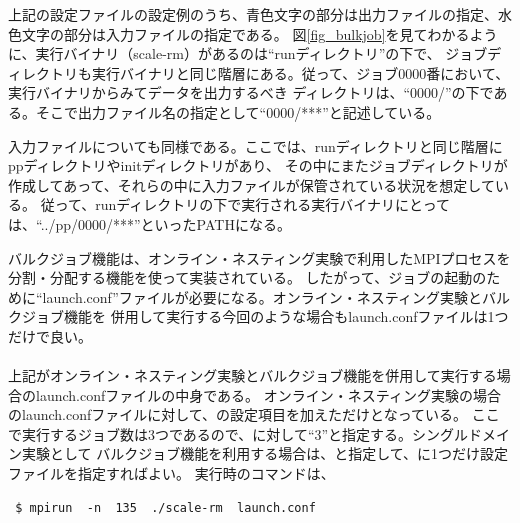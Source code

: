 \noindent 上記の設定ファイルの設定例のうち、青色文字の部分は出力ファイルの指定、水色文字の部分は入力ファイルの指定である。
図\ref{fig_bulkjob}を見てわかるように、実行バイナリ（scale-rm）があるのは``runディレクトリ''の下で、
ジョブディレクトリも実行バイナリと同じ階層にある。従って、ジョブ0000番において、実行バイナリからみてデータを出力するべき
ディレクトリは、``0000/''の下である。そこで出力ファイル名の指定として``0000/***''と記述している。

入力ファイルについても同様である。ここでは、runディレクトリと同じ階層にppディレクトリやinitディレクトリがあり、
その中にまたジョブディレクトリが作成してあって、それらの中に入力ファイルが保管されている状況を想定している。
従って、runディレクトリの下で実行される実行バイナリにとっては、``../pp/0000/***''といったPATHになる。

バルクジョブ機能は、オンライン・ネスティング実験で利用したMPIプロセスを分割・分配する機能を使って実装されている。
したがって、ジョブの起動のために``launch.conf''ファイルが必要になる。オンライン・ネスティング実験とバルクジョブ機能を
併用して実行する今回のような場合もlaunch.confファイルは1つだけで良い。\\

\\

\noindent 上記がオンライン・ネスティング実験とバルクジョブ機能を併用して実行する場合のlaunch.confファイルの中身である。
オンライン・ネスティング実験の場合のlaunch.confファイルに対して、の設定項目を加えただけとなっている。
ここで実行するジョブ数は3つであるので、に対して``3''と指定する。シングルドメイン実験として
バルクジョブ機能を利用する場合は、と指定して、に1つだけ設定ファイルを指定すればよい。
実行時のコマンドは、

\begin{verbatim}
 $ mpirun  -n  135  ./scale-rm  launch.conf
\end{verbatim}

